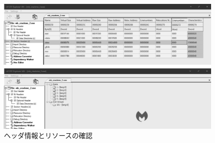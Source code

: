 \begin{figure}[H]
    \centering
    \includegraphics[width=\linewidth]{./assets/takuzoo3868asset/cff_header_gray.png}
    \caption{ヘッダ情報とリソースの確認}
    \label{fig:cff}
\end{figure}

